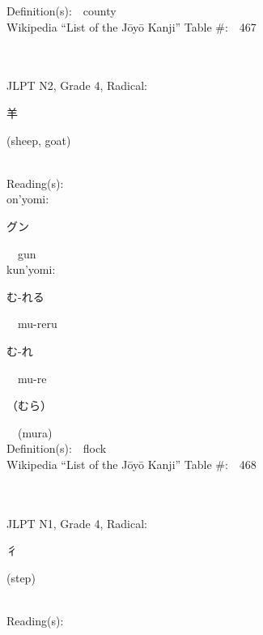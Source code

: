 \begin{multicols}{2}
Definition(s):\ \ county \\
Wikipedia ``List of the J\=oy\=o Kanji'' Table \#:\ \ 467 \\
\ \ \\
{\fontsize{34pt}{40pt}  }\ \ \\  %
{JLPT N2, Grade 4, Radical:\ \ {\begin{CJK}{UTF8}{min} 羊 \end{CJK}} (sheep, goat) } \\
Reading(s):\ \ \\
{\hspace*{1em}}on'yomi:\ \ \\
{\hspace*{2em}}{\begin{CJK}{UTF8}{min} グン \end{CJK}}\ \ gun\ \ \\
{\hspace*{1em}}kun'yomi:\ \ \\
{\hspace*{2em}}{\begin{CJK}{UTF8}{min} む-れる \end{CJK}}\ \ mu-reru\ \ \\
{\hspace*{2em}}{\begin{CJK}{UTF8}{min} む-れ \end{CJK}}\ \ mu-re\ \ \\
{\hspace*{2em}}{\begin{CJK}{UTF8}{min} （むら） \end{CJK}}\ \ (mura)\ \ \\
Definition(s):\ \ flock \\
Wikipedia ``List of the J\=oy\=o Kanji'' Table \#:\ \ 468 \\
\ \ \\
{\fontsize{34pt}{40pt}  }\ \ \\  %
{JLPT N1, Grade 4, Radical:\ \ {\begin{CJK}{UTF8}{min} 彳 \end{CJK}} (step) } \\
Reading(s):\ \ \\

\end{multicols}
